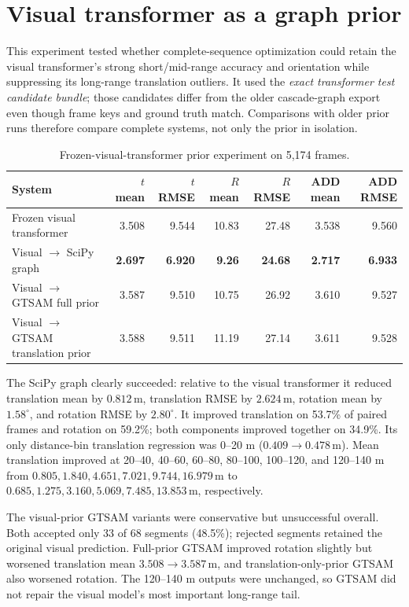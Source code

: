 \documentclass[11pt]{article}
\newcommand{\best}[1]{\textbf{#1}}
\newcommand{\unitm}{\,\mathrm{m}}
\newcommand{\unitdeg}{^{\circ}}
\begin{document}
\section{Visual transformer as a graph prior}

This experiment tested whether complete-sequence optimization could retain the visual transformer's strong short/mid-range accuracy and orientation while suppressing its long-range translation outliers.  It used the \emph{exact transformer test candidate bundle}; those candidates differ from the older cascade-graph export even though frame keys and ground truth match.  Comparisons with older prior runs therefore compare complete systems, not only the prior in isolation.

\begin{table}[H]
\centering
\caption{Frozen-visual-transformer prior experiment on 5,174 frames.}
\begin{tabular}{lrrrrrr}
\toprule
System & $t$ mean & $t$ RMSE & $R$ mean & $R$ RMSE & ADD mean & ADD RMSE\\
\midrule
Frozen visual transformer & 3.508 & 9.544 & 10.83 & 27.48 & 3.538 & 9.560\\
Visual $\rightarrow$ SciPy graph & \best{2.697} & \best{6.920} & \best{9.26} & \best{24.68} & \best{2.717} & \best{6.933}\\
Visual $\rightarrow$ GTSAM full prior & 3.587 & 9.510 & 10.75 & 26.92 & 3.610 & 9.527\\
Visual $\rightarrow$ GTSAM translation prior & 3.588 & 9.511 & 11.19 & 27.14 & 3.611 & 9.528\\
\bottomrule
\end{tabular}
\end{table}

The SciPy graph clearly succeeded: relative to the visual transformer it reduced translation mean by $0.812\unitm$, translation RMSE by $2.624\unitm$, rotation mean by $1.58\unitdeg$, and rotation RMSE by $2.80\unitdeg$.  It improved translation on 53.7\% of paired frames and rotation on 59.2\%; both components improved together on 34.9\%.  Its only distance-bin translation regression was 0--20 m ($0.409\rightarrow0.478\unitm$).  Mean translation improved at 20--40, 40--60, 60--80, 80--100, 100--120, and 120--140 m from $0.805,1.840,4.651,7.021,9.744,16.979\unitm$ to $0.685,1.275,3.160,5.069,7.485,13.853\unitm$, respectively.

The visual-prior GTSAM variants were conservative but unsuccessful overall.  Both accepted only 33 of 68 segments (48.5\%); rejected segments retained the original visual prediction.  Full-prior GTSAM improved rotation slightly but worsened translation mean $3.508\rightarrow3.587\unitm$, and translation-only-prior GTSAM also worsened rotation.  The 120--140 m outputs were unchanged, so GTSAM did not repair the visual model's most important long-range tail.
\end{document}
